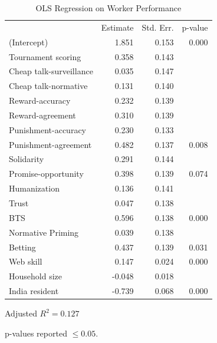 \documentclass{chi2009}
\begin{document}
{%
\begin{table}[ht]					%
\begin{center}						%
\caption{OLS Regression on Worker Performance} %
\vspace{8pt}
\begin{threeparttable}
\begin{tabular}{@{}l r  r r@{}}
\toprule
 & Estimate & Std. Err. & p-value\tnote{\dag}\\
\cmidrule(l){2-4}
(Intercept) & 1.851 & 0.153 & 0.000\\
Tournament scoring & 0.358 & 0.143 &\\
Cheap talk-surveillance & 0.035 & 0.147 &\\
Cheap talk-normative & 0.131 & 0.140 &\\
Reward-accuracy & 0.232 & 0.139 &\\
Reward-agreement & 0.310 & 0.139 &\\
Punishment-accuracy & 0.230 & 0.133 &\\
Punishment-agreement & 0.482 & 0.137 & 0.008\\
Solidarity & 0.291 & 0.144 &\\
Promise-opportunity & 0.398 & 0.139 & 0.074\\
Humanization & 0.136 & 0.141 &\\
Trust & 0.047 & 0.138 &\\
BTS & 0.596 & 0.138 & 0.000\\
Normative Priming & 0.039 & 0.138 &\\
Betting & 0.437 & 0.139 & 0.031\\
Web skill & 0.147 & 0.024 & 0.000\\
Household size  & -0.048 & 0.018 &\\
India resident & -0.739 & 0.068 & 0.000\\
\bottomrule
\end{tabular}
  \begin{tablenotes}[para]
	\item Adjusted $R^{2} = 0.127$\\
	\item[\dag]p-values reported $\leq 0.05$.\\
  \end{tablenotes}
\end{threeparttable}
\label{table:demog_control_model}
\end{center}
\end{table}


}
\end{document}
